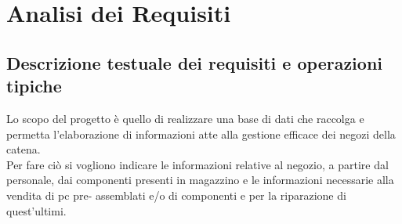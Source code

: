 \section{Analisi dei Requisiti}
\subsection{Descrizione testuale dei requisiti e operazioni tipiche}
Lo scopo del progetto è quello di realizzare una base di dati che raccolga e permetta 							l'elaborazione di 	informazioni atte alla gestione efficace dei negozi della catena.\\ 
Per fare ciò si vogliono indicare le informazioni relative al negozio, a partire dal personale, dai 		componenti presenti in magazzino e le informazioni necessarie alla vendita di pc pre-							assemblati e/o di componenti e per la riparazione di quest'ultimi.\par

